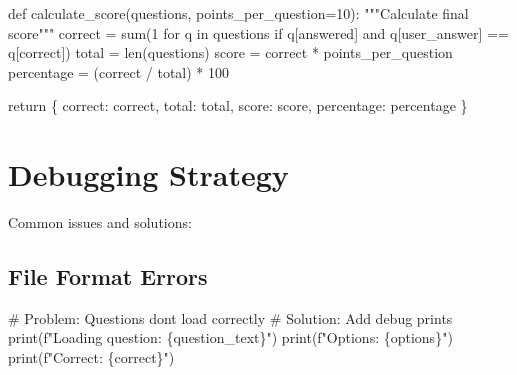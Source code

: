 \documentclass[
  letterpaper,
  DIV=11,
  numbers=noendperiod,
  oneside]{scrreprt}
\newenvironment{Shaded}{}{}
\newcommand{\BuiltInTok}[1]{\textcolor[rgb]{0.84,0.23,0.29}{#1}}
\newcommand{\CommentTok}[1]{\textcolor[rgb]{0.42,0.45,0.49}{#1}}
\newcommand{\ControlFlowTok}[1]{\textcolor[rgb]{0.84,0.23,0.29}{#1}}
\newcommand{\DecValTok}[1]{\textcolor[rgb]{0.00,0.36,0.77}{#1}}
\newcommand{\KeywordTok}[1]{\textcolor[rgb]{0.84,0.23,0.29}{#1}}
\newcommand{\NormalTok}[1]{\textcolor[rgb]{0.14,0.16,0.18}{#1}}
\newcommand{\OperatorTok}[1]{\textcolor[rgb]{0.14,0.16,0.18}{#1}}
\newcommand{\SpecialCharTok}[1]{\textcolor[rgb]{0.00,0.36,0.77}{#1}}
\newcommand{\SpecialStringTok}[1]{\textcolor[rgb]{0.01,0.18,0.38}{#1}}
\newcommand{\StringTok}[1]{\textcolor[rgb]{0.01,0.18,0.38}{#1}}
\begin{document}
\begin{Shaded}
\begin{Highlighting}[]
\KeywordTok{def}\NormalTok{ calculate\_score(questions, points\_per\_question}\OperatorTok{=}\DecValTok{10}\NormalTok{):}
    \CommentTok{"""Calculate final score"""}
\NormalTok{    correct }\OperatorTok{=} \BuiltInTok{sum}\NormalTok{(}\DecValTok{1} \ControlFlowTok{for}\NormalTok{ q }\KeywordTok{in}\NormalTok{ questions }\ControlFlowTok{if}\NormalTok{ q[}\StringTok{\textquotesingle{}answered\textquotesingle{}}\NormalTok{] }\KeywordTok{and} 
\NormalTok{                  q[}\StringTok{\textquotesingle{}user\_answer\textquotesingle{}}\NormalTok{] }\OperatorTok{==}\NormalTok{ q[}\StringTok{\textquotesingle{}correct\textquotesingle{}}\NormalTok{])}
\NormalTok{    total }\OperatorTok{=} \BuiltInTok{len}\NormalTok{(questions)}
\NormalTok{    score }\OperatorTok{=}\NormalTok{ correct }\OperatorTok{*}\NormalTok{ points\_per\_question}
\NormalTok{    percentage }\OperatorTok{=}\NormalTok{ (correct }\OperatorTok{/}\NormalTok{ total) }\OperatorTok{*} \DecValTok{100}
    
    \ControlFlowTok{return}\NormalTok{ \{}
        \StringTok{\textquotesingle{}correct\textquotesingle{}}\NormalTok{: correct,}
        \StringTok{\textquotesingle{}total\textquotesingle{}}\NormalTok{: total,}
        \StringTok{\textquotesingle{}score\textquotesingle{}}\NormalTok{: score,}
        \StringTok{\textquotesingle{}percentage\textquotesingle{}}\NormalTok{: percentage}
\NormalTok{    \}}
\end{Highlighting}
\end{Shaded}

\section{Debugging Strategy}\label{debugging-strategy-7}

Common issues and solutions:

\subsection{File Format Errors}\label{file-format-errors}

\begin{Shaded}
\begin{Highlighting}[]
\CommentTok{\# Problem: Questions don\textquotesingle{}t load correctly}
\CommentTok{\# Solution: Add debug prints}
\BuiltInTok{print}\NormalTok{(}\SpecialStringTok{f"Loading question: }\SpecialCharTok{\{}\NormalTok{question\_text}\SpecialCharTok{\}}\SpecialStringTok{"}\NormalTok{)}
\BuiltInTok{print}\NormalTok{(}\SpecialStringTok{f"Options: }\SpecialCharTok{\{}\NormalTok{options}\SpecialCharTok{\}}\SpecialStringTok{"}\NormalTok{)}
\BuiltInTok{print}\NormalTok{(}\SpecialStringTok{f"Correct: }\SpecialCharTok{\{}\NormalTok{correct}\SpecialCharTok{\}}\SpecialStringTok{"}\NormalTok{)}
\end{Highlighting}
\end{Shaded}
\end{document}
